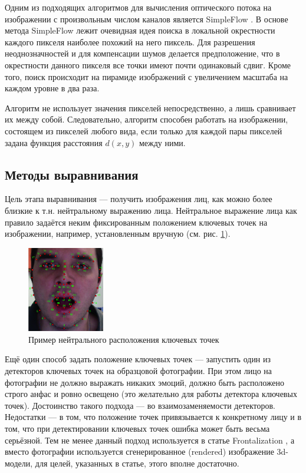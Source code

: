 
Одним из подходящих алгоритмов для вычисления оптического потока на изображении с произвольным числом каналов является SimpleFlow \cite{simple_flow}. В основе метода SimpleFlow лежит очевидная идея поиска в локальной окрестности каждого пикселя наиболее похожий на него пиксель. Для разрешения неоднозначностей и для компенсации шумов делается предположение, что в окрестности данного пикселя все точки имеют почти одинаковый сдвиг. Кроме того, поиск происходит на пирамиде изображений с увеличением масштаба на каждом уровне в два раза.

Алгоритм не использует значения пикселей непосредственно, а лишь сравнивает их между собой. Следовательно, алгоритм способен работать на изображении, состоящем из пикселей любого вида, если только для каждой пары пикселей задана функция расстояния $ d(x, y) $ между ними.

\subsection{Методы выравнивания}

Цель этапа выравнивания --- получить изображения лиц, как можно более близкие к т.н. нейтральному выражению лица. Нейтральное выражение лица как правило задаётся неким фиксированным положением ключевых точек на изображении, например, установленным вручную (см. рис. \ref{fig:neutral}).

\begin{figure}[t]
	\centering
	\includegraphics[width=0.3\textwidth]{avatar-annotation.png}
	\caption{Пример нейтрального расположения ключевых точек}
	\label{fig:neutral}
\end{figure}

Ещё один способ задать положение ключевых точек --- запустить один из детекторов ключевых точек на образцовой фотографии. При этом лицо на фотографии не должно выражать никаких эмоций, должно быть расположено строго анфас и ровно освещено (это желательно для работы детектора ключевых точек). Достоинство такого подхода --- во взаимозаменяемости детекторов. Недостатки --- в том, что положение точек привязывается к конкретному лицу и в том, что при детектировании ключевых точек ошибка может быть весьма серьёзной. Тем не менее данный подход используется в статье Frontalization \cite{frontalization}, а вместо фотографии используется сгенерированное (rendered) изображение 3d-модели, для целей, указанных в статье, этого вполне достаточно.

